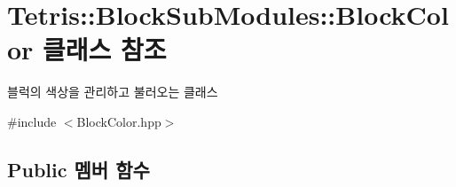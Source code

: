 \hypertarget{class_tetris_1_1_block_sub_modules_1_1_block_color}{}\section{Tetris\+:\+:Block\+Sub\+Modules\+:\+:Block\+Color 클래스 참조}
\label{class_tetris_1_1_block_sub_modules_1_1_block_color}


블럭의 색상을 관리하고 불러오는 클래스  




{\ttfamily \#include $<$Block\+Color.\+hpp$>$}

\subsection*{Public 멤버 함수}
